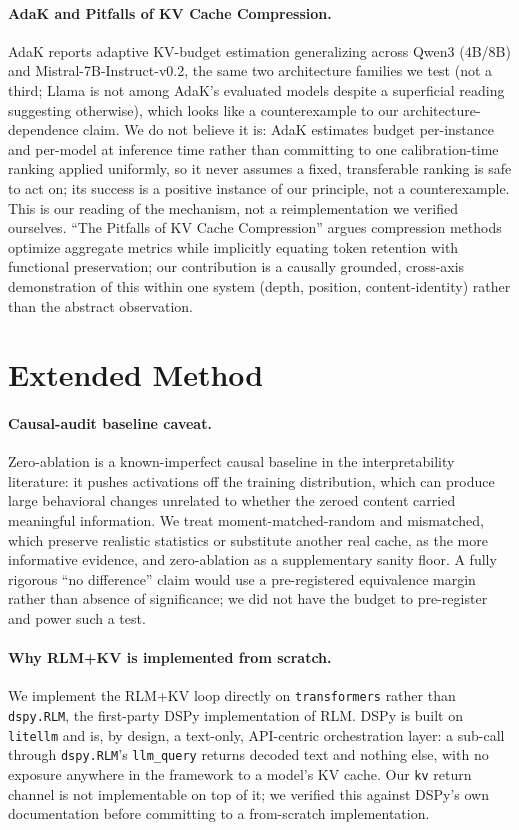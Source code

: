 \documentclass[11pt]{article}
\begin{document}
\paragraph{AdaK and Pitfalls of KV Cache Compression.} AdaK
\citep{adak2026} reports adaptive KV-budget estimation generalizing
across Qwen3 (4B/8B) and Mistral-7B-Instruct-v0.2, the same two
architecture families we test (not a third; Llama is not among AdaK's
evaluated models despite a superficial reading suggesting otherwise),
which looks like a counterexample to our architecture-dependence claim.
We do not believe it is: AdaK estimates budget per-instance and
per-model at inference time rather than committing to one
calibration-time ranking applied uniformly, so it never assumes a
fixed, transferable ranking is safe to act on; its success is a
positive instance of our principle, not a counterexample. This is our
reading of the mechanism, not a reimplementation we verified ourselves.
``The Pitfalls of KV Cache Compression'' \citep{pitfallskv2026} argues
compression methods optimize aggregate metrics while implicitly
equating token retention with functional preservation; our contribution
is a causally grounded, cross-axis demonstration of this within one
system (depth, position, content-identity) rather than the abstract
observation.

\section{Extended Method}
\label{app:method-ext}

\paragraph{Causal-audit baseline caveat.} Zero-ablation is a
known-imperfect causal baseline in the interpretability literature: it
pushes activations off the training distribution, which can produce
large behavioral changes unrelated to whether the zeroed content
carried meaningful information. We treat moment-matched-random and
mismatched, which preserve realistic statistics or substitute another
real cache, as the more informative evidence, and zero-ablation as a
supplementary sanity floor. A fully rigorous ``no difference'' claim
would use a pre-registered equivalence margin rather than absence of
significance; we did not have the budget to pre-register and power such
a test.

\paragraph{Why RLM+KV is implemented from scratch.} We implement the
RLM+KV loop directly on \texttt{transformers} \citep{transformers2020}
rather than \texttt{dspy.RLM}, the first-party DSPy implementation of
RLM. DSPy is built on \texttt{litellm} and is, by design, a text-only,
API-centric orchestration layer: a sub-call through \texttt{dspy.RLM}'s
\texttt{llm\_query} returns decoded text and nothing else, with no
exposure anywhere in the framework to a model's KV cache. Our
\texttt{kv} return channel is not implementable on top of it; we
verified this against DSPy's own documentation before committing to a
from-scratch implementation.
\end{document}
